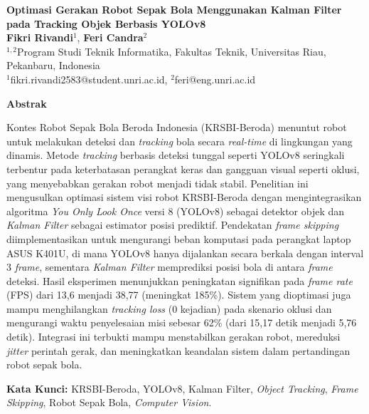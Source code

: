 \documentclass[12pt,a4paper]{article}
\begin{document}
\begin{center}
    {\LARGE \textbf{Optimasi Gerakan Robot Sepak Bola Menggunakan Kalman Filter pada Tracking Objek Berbasis YOLOv8}} \\[1cm]
    
    {\large \textbf{Fikri Rivandi}$^{1}$, \textbf{Feri Candra}$^{2}$} \\[0.3cm]
    {\normalsize $^{1,2}$Program Studi Teknik Informatika, Fakultas Teknik, Universitas Riau, Pekanbaru, Indonesia} \\[0.2cm]
    {\normalsize $^{1}$fikri.rivandi2583@student.unri.ac.id, $^{2}$feri@eng.unri.ac.id}
\end{center}

\vspace{0.5cm}

\begin{center}
    {\large \textbf{Abstrak}}
\end{center}
\noindent
Kontes Robot Sepak Bola Beroda Indonesia (KRSBI-Beroda) menuntut robot untuk melakukan deteksi dan \textit{tracking} bola secara \textit{real-time} di lingkungan yang dinamis. Metode \textit{tracking} berbasis deteksi tunggal seperti YOLOv8 seringkali terbentur pada keterbatasan perangkat keras dan gangguan visual seperti oklusi, yang menyebabkan gerakan robot menjadi tidak stabil. Penelitian ini mengusulkan optimasi sistem visi robot KRSBI-Beroda dengan mengintegrasikan algoritma \textit{You Only Look Once} versi 8 (YOLOv8) sebagai detektor objek dan \textit{Kalman Filter} sebagai estimator posisi prediktif. Pendekatan \textit{frame skipping} diimplementasikan untuk mengurangi beban komputasi pada perangkat laptop ASUS K401U, di mana YOLOv8 hanya dijalankan secara berkala dengan interval 3 \textit{frame}, sementara \textit{Kalman Filter} memprediksi posisi bola di antara \textit{frame} deteksi. Hasil eksperimen menunjukkan peningkatan signifikan pada \textit{frame rate} (FPS) dari 13,6 menjadi 38,77 (meningkat 185\%). Sistem yang dioptimasi juga mampu menghilangkan \textit{tracking loss} (0 kejadian) pada skenario oklusi dan mengurangi waktu penyelesaian misi sebesar 62\% (dari 15,17 detik menjadi 5,76 detik). Integrasi ini terbukti mampu menstabilkan gerakan robot, mereduksi \textit{jitter} perintah gerak, dan meningkatkan keandalan sistem dalam pertandingan robot sepak bola.

\vspace{0.3cm}
\textbf{Kata Kunci:} KRSBI-Beroda, YOLOv8, Kalman Filter, \textit{Object Tracking}, \textit{Frame Skipping}, Robot Sepak Bola, \textit{Computer Vision}.
\end{document}
